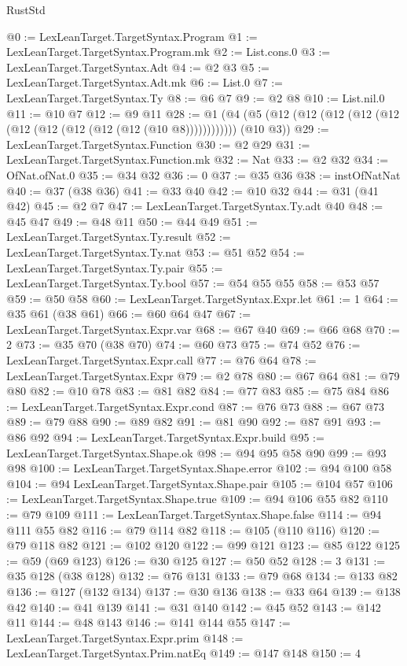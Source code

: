 \begin{lexlean}{RustStd}
\begin{coremodule}
{\begin{coremodule}
{{{{{{{{{{{{{{{{{{{{{{{{{{{{{{{@0 := LexLeanTarget.TargetSyntax.Program
@1 := LexLeanTarget.TargetSyntax.Program.mk
@2 := List.cons.{0}
@3 := LexLeanTarget.TargetSyntax.Adt
@4 := @2 @3
@5 := LexLeanTarget.TargetSyntax.Adt.mk
@6 := List.{0}
@7 := LexLeanTarget.TargetSyntax.Ty
@8 := @6 @7
@9 := @2 @8
@10 := List.nil.{0}
@11 := @10 @7
@12 := @9 @11
@28 := @1 (@4 (@5 (@12 (@12 (@12 (@12 (@12 (@12 (@12 (@12 (@12 (@12 (@10 @8)))))))))))) (@10 @3))
@29 := LexLeanTarget.TargetSyntax.Function
@30 := @2 @29
@31 := LexLeanTarget.TargetSyntax.Function.mk
@32 := Nat
@33 := @2 @32
@34 := OfNat.ofNat.{0}
@35 := @34 @32
@36 := 0
@37 := @35 @36
@38 := instOfNatNat
@40 := @37 (@38 @36)
@41 := @33 @40
@42 := @10 @32
@44 := @31 (@41 @42)
@45 := @2 @7
@47 := LexLeanTarget.TargetSyntax.Ty.adt @40
@48 := @45 @47
@49 := @48 @11
@50 := @44 @49
@51 := LexLeanTarget.TargetSyntax.Ty.result
@52 := LexLeanTarget.TargetSyntax.Ty.nat
@53 := @51 @52
@54 := LexLeanTarget.TargetSyntax.Ty.pair
@55 := LexLeanTarget.TargetSyntax.Ty.bool
@57 := @54 @55 @55
@58 := @53 @57
@59 := @50 @58
@60 := LexLeanTarget.TargetSyntax.Expr.let
@61 := 1
@64 := @35 @61 (@38 @61)
@66 := @60 @64 @47
@67 := LexLeanTarget.TargetSyntax.Expr.var
@68 := @67 @40
@69 := @66 @68
@70 := 2
@73 := @35 @70 (@38 @70)
@74 := @60 @73
@75 := @74 @52
@76 := LexLeanTarget.TargetSyntax.Expr.call
@77 := @76 @64
@78 := LexLeanTarget.TargetSyntax.Expr
@79 := @2 @78
@80 := @67 @64
@81 := @79 @80
@82 := @10 @78
@83 := @81 @82
@84 := @77 @83
@85 := @75 @84
@86 := LexLeanTarget.TargetSyntax.Expr.cond
@87 := @76 @73
@88 := @67 @73
@89 := @79 @88
@90 := @89 @82
@91 := @81 @90
@92 := @87 @91
@93 := @86 @92
@94 := LexLeanTarget.TargetSyntax.Expr.build
@95 := LexLeanTarget.TargetSyntax.Shape.ok
@98 := @94 @95 @58 @90
@99 := @93 @98
@100 := LexLeanTarget.TargetSyntax.Shape.error
@102 := @94 @100 @58
@104 := @94 LexLeanTarget.TargetSyntax.Shape.pair
@105 := @104 @57
@106 := LexLeanTarget.TargetSyntax.Shape.true
@109 := @94 @106 @55 @82
@110 := @79 @109
@111 := LexLeanTarget.TargetSyntax.Shape.false
@114 := @94 @111 @55 @82
@116 := @79 @114 @82
@118 := @105 (@110 @116)
@120 := @79 @118 @82
@121 := @102 @120
@122 := @99 @121
@123 := @85 @122
@125 := @59 (@69 @123)
@126 := @30 @125
@127 := @50 @52
@128 := 3
@131 := @35 @128 (@38 @128)
@132 := @76 @131
@133 := @79 @68
@134 := @133 @82
@136 := @127 (@132 @134)
@137 := @30 @136
@138 := @33 @64
@139 := @138 @42
@140 := @41 @139
@141 := @31 @140
@142 := @45 @52
@143 := @142 @11
@144 := @48 @143
@146 := @141 @144 @55
@147 := LexLeanTarget.TargetSyntax.Expr.prim
@148 := LexLeanTarget.TargetSyntax.Prim.natEq
@149 := @147 @148
@150 := 4
}}}}}}}}}}}}}}}}}}}}}}}}}}}}}}}
\end{coremodule}}
\end{coremodule}
\end{lexlean}
